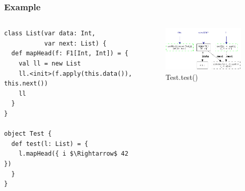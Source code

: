 \documentclass[hyperref={pdfpagelabels=false}]{beamer}
\begin{document}
\begin{frame}[fragile]
\frametitle{Example}
  \begin{columns}
    \begin{column}{0.4\textwidth}
\begin{lstlisting}[escapechar=\%]
class List(var data: Int,
           var next: List) {
  def mapHead(f: F1[Int, Int]) = {
    val ll = new List
    ll.<init>(f.apply(this.data()), this.next())
    ll
  }
}

object Test {
  def test(l: List) = {
    l.mapHead({ i $\Rightarrow$ 42 })
  }
}
\end{lstlisting}
    \end{column}
    \begin{column}{0.6\textwidth}
      \begin{figure}[t]
        \begin{center}
        \includegraphics[width=60mm]{images/e5.png}\\
        Test.test()
        \end{center}
      \end{figure}
    \end{column}
  \end{columns}
\end{frame}
\end{document}
